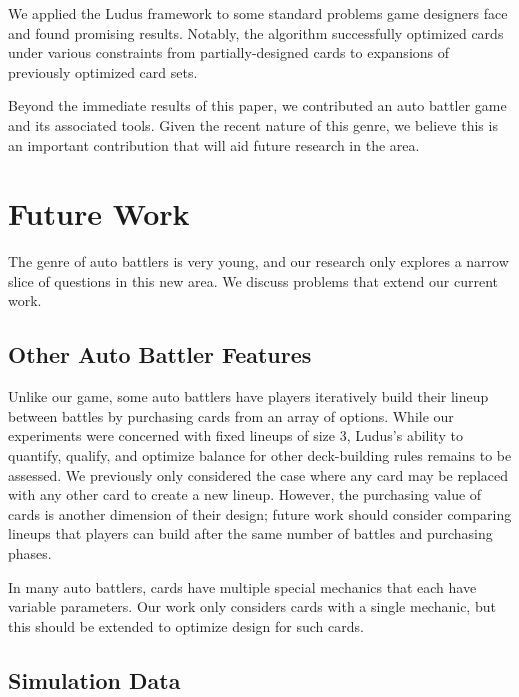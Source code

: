 \documentclass[letterpaper]{article} %
\begin{document}
We applied the {\sc Ludus} framework to some standard problems game designers face and found promising results. Notably, the algorithm successfully optimized cards under various constraints from partially-designed cards to expansions of %
previously optimized card sets.

Beyond the immediate results of this paper, we contributed an auto battler game and its associated tools. %
Given the recent nature of this genre, we believe this is an important contribution that will aid future research in the area.

\section{Future Work} \label{sec:futurework}
The genre of auto battlers is very young, and our research only explores a narrow slice of questions in this new area. We discuss problems that extend our current work.

\subsection{Other Auto Battler Features}


Unlike our game, some auto battlers have
players iteratively build their lineup between battles by purchasing
cards from an array of options. While our experiments were concerned with fixed lineups of size 3, 
{\sc Ludus}'s ability to quantify, qualify, and optimize balance for other deck-building rules %
remains to be assessed. We previously only considered
the case where any card may be replaced with any other card to create a new lineup. However, 
the purchasing value of cards is another dimension of their design; %
future work should consider comparing lineups
that players can build after the same number of battles and purchasing phases.


In many auto battlers, cards have multiple special mechanics that each have variable parameters.
Our work only considers cards with a single mechanic, but this should be extended to optimize design for such cards.


\subsection{Simulation Data}
\end{document}
